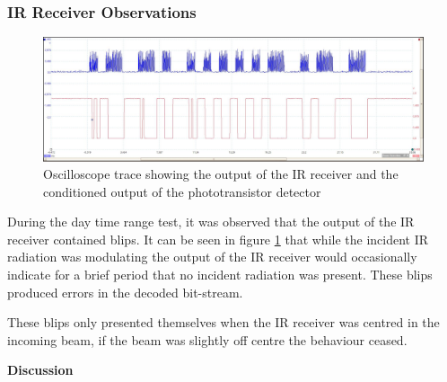 \subsubsection{IR Receiver Observations}

\begin{figure}[H]
	\centering
	\includegraphics[width=.9\textwidth]{figures/results/system_test/36m_phototranaistoroutput_vs_receiveroutput.JPG}
	\caption{Oscilloscope trace showing the output of the IR receiver and the conditioned output of the phototransistor detector}
	\label{fig:36m_phototranaistoroutput_vs_receiveroutput}
\end{figure}

During the day time range test, it was observed that the output of the IR receiver contained blips. It can be seen in figure \ref{fig:36m_phototranaistoroutput_vs_receiveroutput} that while the incident IR radiation was modulating the output of the IR receiver would occasionally indicate for a brief period that no incident radiation was present. These blips produced errors in the decoded bit-stream.

These blips only presented themselves when the IR receiver was centred in the incoming beam, if the beam was slightly off centre the behaviour ceased.


\textbf{Discussion}\\


